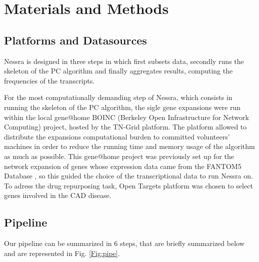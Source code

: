 \documentclass[fleqn,10pt]{SelfArx} %
\begin{document}
\section*{Materials and Methods}

\subsection*{Platforms and Datasources}

Nessra is designed in three steps in which first subsets data,
secondly runs the skeleton of the PC algorithm and finally aggregates results, computing the frequencies of the transcripts.

For the most computationally demanding step of Nessra, which consists in running the skeleton of the PC algorithm, the sigle gene expansions were run within the local gene@home \cite{boinc} BOINC (Berkeley Open Infrastructure for Network Computing) project, hosted by the TN-Grid platform. 
The platform allowed to distribute the expansions computational burden to committed volunteers' machines in order to reduce the running time and memory usage of the algorithm as much as possible.
This gene@home project was previously set up for the network expansion of genes whose expression data came from the FANTOM5 Database \cite{fantom}, so this guided the choice of the transcriptional data to run Nessra on.
To adress the drug repurposing task, Open Targets\cite{open} platform was chosen to select genes involved in the CAD disease.  


\subsection*{Pipeline}

Our pipeline can be summarized in  6 steps, that are briefly summarized below and are represented in Fig. \ref{Fig:pipe}.
\end{document}
